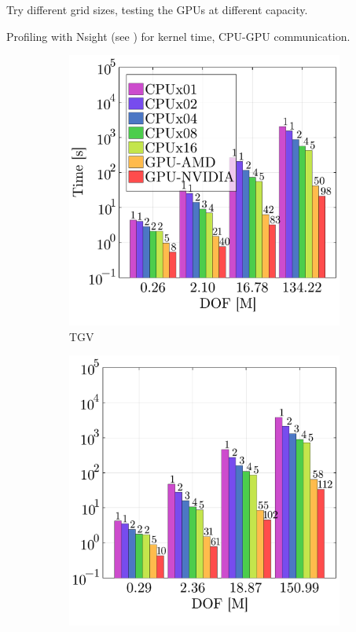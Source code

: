 \documentclass[final,3p,times]{elsarticle}
\begin{document}
Try different grid sizes, testing the GPUs at different capacity.

Profiling with Nsight (see \cite{Gasparino2024}) for kernel time, CPU-GPU communication.

\begin{figure}[!ht]
  \centering
  \begin{subfigure}[t]{0.33\linewidth}
      \centering
      \includegraphics[width=\linewidth]{img/tgv_benchmark.pdf}
      \caption{TGV}
  \end{subfigure}
  \begin{subfigure}[t]{0.33\linewidth}
    \centering\hspace*{-0.2cm}
    \includegraphics[width=\linewidth]{img/sphere_benchmark.pdf}

\end{subfigure}
\end{figure}
\end{document}
